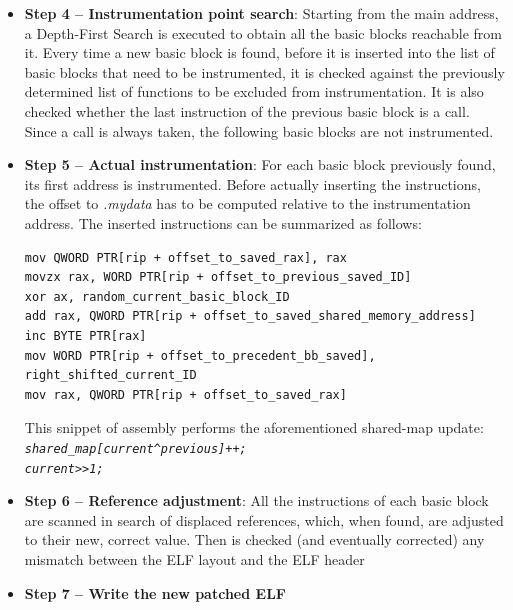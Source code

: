 \documentclass{report}
\begin{document}
\begin{itemize}
                \item \textbf{Step 4 -- Instrumentation point search}: Starting from the main address, a Depth-First Search is executed
                                    to obtain all the basic blocks reachable from it.
                                    Every time a new basic block is found, before it is inserted into the list of basic blocks that need to be instrumented,
                                    it is checked against the previously determined list of functions to be excluded from instrumentation.
                                    It is also checked whether the last instruction of the previous basic block is a call.
                                    Since a call is always taken, the following basic blocks are not instrumented.
                \item \textbf{Step 5 -- Actual instrumentation}: For each basic block previously found, its first address is instrumented.
                    Before actually inserting the instructions, the offset to \textit{.mydata} has to be computed relative to the instrumentation address.
                    The inserted instructions can be summarized as follows:
                    \begin{lstlisting}[style=customasm, caption={Shared Map Update Code}, label=Shared Map Update Code]
mov QWORD PTR[rip + offset_to_saved_rax], rax
movzx rax, WORD PTR[rip + offset_to_previous_saved_ID]        
xor ax, random_current_basic_block_ID
add rax, QWORD PTR[rip + offset_to_saved_shared_memory_address]
inc BYTE PTR[rax]
mov WORD PTR[rip + offset_to_precedent_bb_saved], right_shifted_current_ID
mov rax, QWORD PTR[rip + offset_to_saved_rax]
                    \end{lstlisting}       
                    This snippet of assembly performs the aforementioned shared-map update:\\
                     \textit{\lstinline|shared_map[current^previous]++;|}\\
                    \textit{\lstinline|current>>1;|}       
        
                \item \textbf{Step 6 -- Reference adjustment}: All the instructions of each basic block are scanned in search of
                    displaced references, which, when found, are adjusted to their new, correct value. 
                    Then is checked (and eventually corrected) any mismatch between the ELF layout and the ELF header
                \item \textbf{Step 7 -- Write the new patched ELF}
            \end{itemize}
\end{document}

